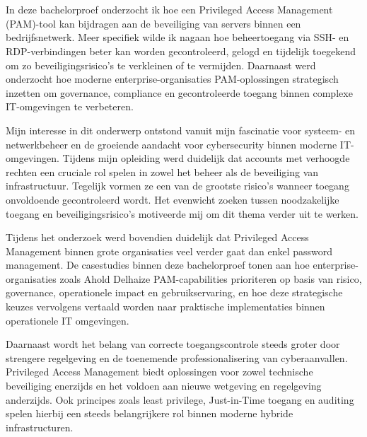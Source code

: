 
\chapter*{}%
\label{ch:voorwoord}


In deze bachelorproef onderzocht ik hoe een Privileged Access Management (PAM)-tool kan bijdragen aan de beveiliging van servers binnen een bedrijfsnetwerk. Meer specifiek wilde ik nagaan hoe beheertoegang via SSH- en RDP-verbindingen beter kan worden gecontroleerd, gelogd en tijdelijk toegekend om zo beveiligingsrisico’s te verkleinen of te vermijden. Daarnaast werd onderzocht hoe moderne enterprise-organisaties PAM-oplossingen strategisch inzetten om governance, compliance en gecontroleerde toegang binnen complexe IT-omgevingen te verbeteren.

Mijn interesse in dit onderwerp ontstond vanuit mijn fascinatie voor systeem- en netwerkbeheer en de groeiende aandacht voor cybersecurity binnen moderne IT-omgevingen. Tijdens mijn opleiding werd duidelijk dat accounts met verhoogde rechten een cruciale rol spelen in zowel het beheer als de beveiliging van infrastructuur. Tegelijk vormen ze een van de grootste risico’s wanneer toegang onvoldoende gecontroleerd wordt. Het evenwicht zoeken tussen noodzakelijke toegang en beveiligingsrisico’s motiveerde mij om dit thema verder uit te werken.

Tijdens het onderzoek werd bovendien duidelijk dat Privileged Access Management binnen grote organisaties veel verder gaat dan enkel password management. De casestudies binnen deze bachelorproef tonen aan hoe enterprise-organisaties zoals Ahold Delhaize PAM-capabilities prioriteren op basis van risico, governance, operationele impact en gebruikservaring, en hoe deze strategische keuzes vervolgens vertaald worden naar praktische implementaties binnen operationele IT omgevingen.

Daarnaast wordt het belang van correcte toegangscontrole steeds groter door strengere regelgeving en de toenemende professionalisering van cyberaanvallen. Privileged Access Management biedt oplossingen voor zowel technische beveiliging enerzijds en het voldoen aan nieuwe wetgeving en regelgeving anderzijds. Ook principes zoals least privilege, Just-in-Time toegang en auditing spelen hierbij een steeds belangrijkere rol binnen moderne hybride infrastructuren.

